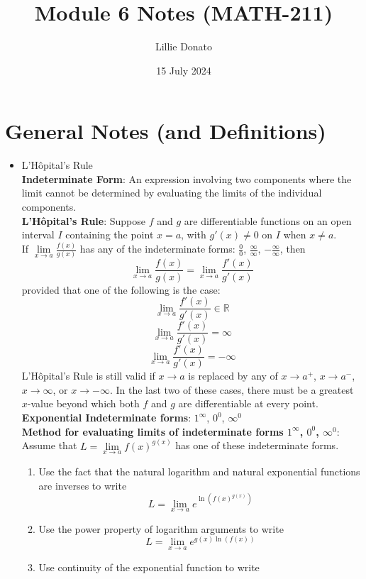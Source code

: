\documentclass{article}
\title{Module 6 Notes (MATH-211)}
\author{Lillie Donato}
\date{15 July 2024}
\begin{document}
\maketitle

\section*{General Notes (and Definitions)}
\begin{itemize}
    \item L'Hôpital's Rule \\
    \textbf{Indeterminate Form}: An expression involving two components where the limit cannot be determined by evaluating the limits of the individual components. \\
    \textbf{L'Hôpital's Rule}: Suppose $f$ and $g$ are differentiable functions on an open interval $I$ containing the point $x = a$, with $g'(x) \neq 0$ on $I$ when $x \neq a$. \\
    If $\lim\limits_{x \to a}{\frac{f(x)}{g(x)}}$ has any of the indeterminate forms: $\frac{0}{0}$, $\frac{\infty}{\infty}$, $-\frac{\infty}{\infty}$, then
    $$\lim_{x \to a}{\frac{f(x)}{g(x)}} = \lim_{x \to a}{\frac{f'(x)}{g'(x)}}$$
    provided that one of the following is the case:
    $$\lim_{x \to a}{\frac{f'(x)}{g'(x)}} \in \mathbb{R}$$
    $$\lim_{x \to a}{\frac{f'(x)}{g'(x)}} = \infty$$
    $$\lim_{x \to a}{\frac{f'(x)}{g'(x)}} = -\infty$$
    L'Hôpital's Rule is still valid if $x \to a$ is replaced by any of $x \to a^+$, $x \to a^-$, $x \to \infty$, or $x \to -\infty$. In the last two of these cases, there must be a greatest $x$-value beyond which both $f$ and $g$ are differentiable at every point. \\
    \textbf{Exponential Indeterminate forms}: $1^{\infty}$, $0^0$, $\infty^0$ \\
    \textbf{Method for evaluating limits of indeterminate forms $1^{\infty}$, $0^0$, $\infty^0$}: \\
    Assume that $L = \lim\limits_{x \to a}{f(x)^{g(x)}}$ has one of these indeterminate forms.
    \begin{enumerate}
        \item Use the fact that the natural logarithm and natural exponential functions are inverses to write
        $$L = \lim_{x \to a}{e^{\ln{\left(f(x)^{g(x)}\right)}}}$$
        \item Use the power property of logarithm arguments to write
        $$L = \lim_{x \to a}{e^{g(x)\ln{\left(f(x)\right)}}}$$
        \item Use continuity of the exponential function to write

\end{enumerate}
\end{itemize}
\end{document}
